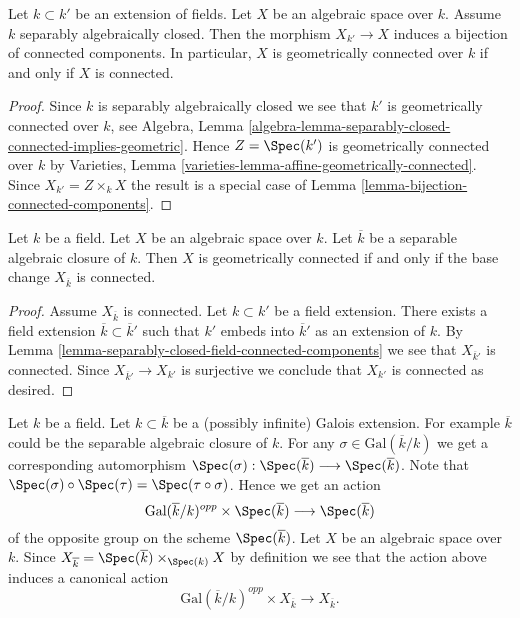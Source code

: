 \begin{lemma}
\label{lemma-separably-closed-field-connected-components}
Let $k \subset k'$ be an extension of fields. Let $X$ be an algebraic space
over $k$. Assume $k$ separably algebraically closed. Then the morphism
$X_{k'} \to X$ induces a bijection of connected components. In particular,
$X$ is geometrically connected over $k$ if and only if $X$ is connected.
\end{lemma}

\begin{proof}
Since $k$ is separably algebraically closed we see that
$k'$ is geometrically connected over $k$, see
Algebra,
Lemma \ref{algebra-lemma-separably-closed-connected-implies-geometric}.
Hence $Z = \Spec(k')$ is geometrically connected over $k$ by
Varieties, Lemma \ref{varieties-lemma-affine-geometrically-connected}.
Since $X_{k'} = Z \times_k X$ the result is a special case of
Lemma \ref{lemma-bijection-connected-components}.
\end{proof}

\begin{lemma}
\label{lemma-characterize-geometrically-connected}
Let $k$ be a field. Let $X$ be an algebraic space over $k$.
Let $\overline{k}$ be a separable algebraic closure of $k$.
Then $X$ is geometrically connected if and only if the base change
$X_{\overline{k}}$ is connected.
\end{lemma}

\begin{proof}
Assume $X_{\overline{k}}$ is connected. Let $k \subset k'$ be a field
extension. There exists a field extension $\overline{k} \subset \overline{k}'$
such that $k'$ embeds into $\overline{k}'$ as an extension of $k$.
By Lemma \ref{lemma-separably-closed-field-connected-components}
we see that $X_{\overline{k}'}$ is connected.
Since $X_{\overline{k}'} \to X_{k'}$ is surjective we conclude
that $X_{k'}$ is connected as desired.
\end{proof}

\noindent
Let $k$ be a field. Let $k \subset \overline{k}$ be a (possibly infinite)
Galois extension. For example $\overline{k}$ could be the
separable algebraic closure of $k$.
For any $\sigma \in \text{Gal}(\overline{k}/k)$ we get a corresponding
automorphism
$
\Spec(\sigma) :
\Spec(\overline{k})
\longrightarrow
\Spec(\overline{k})
$.
Note that
$\Spec(\sigma) \circ \Spec(\tau) = \Spec(\tau \circ \sigma)$.
Hence we get an action
$$
\text{Gal}(\overline{k}/k)^{opp} \times \Spec(\overline{k})
\longrightarrow
\Spec(\overline{k})
$$
of the opposite group on the scheme $\Spec(\overline{k})$.
Let $X$ be an algebraic space over $k$. Since
$X_{\overline{k}} =
\Spec(\overline{k}) \times_{\Spec(k)} X$
by definition we see that the action above induces a canonical action
\begin{equation}
\label{equation-galois-action-base-change-kbar}
\text{Gal}(\overline{k}/k)^{opp} \times X_{\overline{k}}
\longrightarrow
X_{\overline{k}}.
\end{equation}

